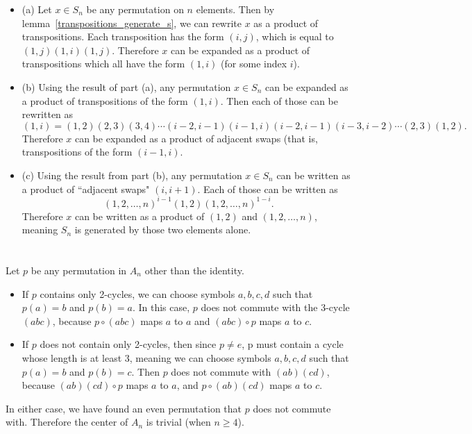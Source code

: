 \documentclass[12pt]{article}
\begin{document}
\begin{itemize}
    \item (a) Let $x \in S_n$ be any permutation on $n$ elements. Then by lemma~\ref{transpositions_generate_s}, we can rewrite $x$ as a product of transpositions. Each transposition has the form $(i,j)$, which is equal to $(1,j)(1,i)(1,j)$. Therefore $x$ can be expanded as a product of transpositions which all have the form $(1,i)$ (for some index $i$).
    \item (b) Using the result of part (a), any permutation $x \in S_n$ can be expanded as a product of transpositions of the form $(1,i)$. Then each of those can be rewritten as
        \[ (1,i) = (1,2)(2,3)(3,4)\cdots(i-2,i-1)(i-1,i)(i-2,i-1)(i-3,i-2)\cdots(2,3)(1,2). \]
        Therefore $x$ can be expanded as a product of adjacent swaps (that is, transpositions of the form $(i-1,i)$.
    \item (c) Using the result from part (b), any permutation $x \in S_n$ can be written as a product of ``adjacent swaps" $(i, i+1)$. Each of those can be written as
        \[ (1,2,\dots,n)^{i-1}(1,2)(1,2,\dots,n)^{1-i}. \]
        Therefore $x$ can be written as a product of $(1,2)$ and $(1,2,\dots,n)$, meaning $S_n$ is generated by those two elements alone.
\end{itemize}

\section{}
\noindent{}\bigskip

Let $p$ be any permutation in $A_n$ other than the identity.
\begin{itemize}
    \item If $p$ contains only 2-cycles, we can choose symbols $a,b,c,d$ such that $p(a)=b$ and $p(b)=a$. In this case, $p$ does not commute with the 3-cycle $(abc)$, because $p \circ (abc)$ maps $a$ to $a$ and $(abc) \circ p$ maps $a$ to $c$.
    \item If $p$ does not contain only 2-cycles, then since $p \neq e$, p must contain a cycle whose length is at least 3, meaning we can choose symbols $a,b,c,d$ such that $p(a)=b$ and $p(b)=c$. Then $p$ does not commute with $(ab)(cd)$, because $(ab)(cd)\circ p$ maps $a$ to $a$, and $p \circ (ab)(cd)$ maps $a$ to $c$.
\end{itemize}
In either case, we have found an even permutation that $p$ does not commute with. Therefore the center of $A_n$ is trivial (when $n \geq 4$).
\end{document}
